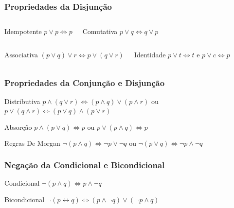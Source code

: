 \documentclass{beamer}
\begin{document}
\begin{frame}
\frametitle{Propriedades da Disjunção}

\begin{columns}[c]
	\large
\begin{block}{Idempotente}
	$p \vee p \Leftrightarrow p$
\end{block}

\begin{block}{Comutativa}
	$p \vee q \Leftrightarrow q \vee p$
\end{block}
\end{columns}\vfill

\begin{columns}[c]
	\large
\begin{block}{Associativa}
	$(p \vee q) \vee r \Leftrightarrow p \vee (q \vee r)$
\end{block}

\begin{block}{Identidade}
	$p \vee t \Leftrightarrow t$ e $p \vee c \Leftrightarrow p$
\end{block}
\end{columns}\vfill

\end{frame}

\begin{frame}
\frametitle{Propriedades da Conjunção e Disjunção}

\begin{block}{Distributiva}
$p \wedge (q \vee r) \Leftrightarrow (p \wedge q) \vee (p \wedge r)$ ou $p \vee (q \wedge r) \Leftrightarrow (p \vee q) \wedge (p \vee r)$
\end{block}\vfill

\begin{block}{Absorção}
$p \wedge (p \vee q) \Leftrightarrow p$ ou $p \vee (p \wedge q) \Leftrightarrow p$
\end{block}\vfill

\begin{block}{Regras De Morgan}
$\neg (p \wedge q) \Leftrightarrow \neg p \vee \neg q$ ou $\neg (p \vee q) \Leftrightarrow \neg p \wedge \neg q$
\end{block}
\end{frame}

\begin{frame}
\frametitle{Negação da Condicional e Bicondicional}

\begin{block}{Condicional}
$\neg (p \wedge q) \Leftrightarrow p \wedge \neg q$
\end{block}\vfill

\begin{block}{Bicondicional}
$\neg (p \leftrightarrow q) \Leftrightarrow (p \wedge \neg q) \vee (\neg p \wedge q)$
\end{block}
\end{frame}
\end{document}

